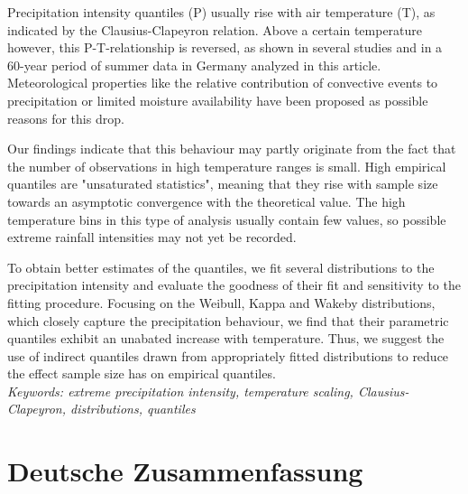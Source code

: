 \documentclass[a4paper]{article}
\begin{document}
\begin{multicols}{2}
Precipitation intensity quantiles (P) usually rise with air temperature (T), as indicated by the Clausius-Clapeyron relation. 
Above a certain temperature however, this P-T-relationship is reversed, as shown in several studies and in a 60-year period of summer data in Germany analyzed in this article.
Meteorological properties like the relative contribution of convective events to precipitation or limited moisture availability have been proposed as possible reasons for this drop.

Our findings indicate that this behaviour may partly originate from the fact that the number of observations in high temperature ranges is small.
High empirical quantiles are "unsaturated statistics", meaning that they rise with sample size towards an asymptotic convergence with the theoretical value.
The high temperature bins in this type of analysis usually contain few values, so possible extreme rainfall intensities may not yet be recorded.

To obtain better estimates of the quantiles, we fit several distributions to the precipitation intensity and evaluate the goodness of their fit and sensitivity to the fitting procedure.
Focusing on the Weibull, Kappa and Wakeby distributions, which closely capture the precipitation behaviour, we find that their parametric quantiles exhibit an unabated increase with temperature. Thus, we suggest the use of indirect quantiles drawn from appropriately fitted distributions to reduce the effect sample size has on empirical quantiles.\\[\baselineskip]
\textit{Keywords: extreme precipitation intensity, temperature scaling, Clausius-Clapeyron, distributions, quantiles}

\end{multicols}


\hypertarget{Zusammenfassung}{}
\section*{Deutsche Zusammenfassung} %
\end{document}
